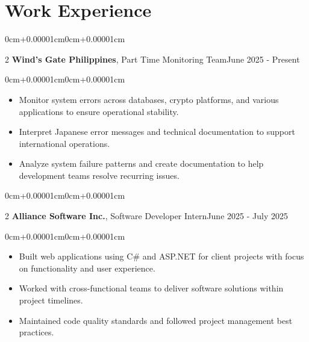 \documentclass[10pt, letterpaper]{article}
\newenvironment{highlights}{\begin{itemize}[topsep=0.10cm,parsep=0.10cm,partopsep=0pt,itemsep=0pt,leftmargin=0cm+10pt]}{\end{itemize}}
\newenvironment{onecolentry}{\begin{adjustwidth}{0cm+0.00001cm}{0cm+0.00001cm}}{\end{adjustwidth}}
\newenvironment{twocolentry}[2][]{\onecolentry\def\secondColumn{#2}\setcolumnwidth{\fill,5cm}\begin{paracol}{2}}{\switchcolumn \raggedleft \secondColumn\end{paracol}\endonecolentry}
\begin{document}
\section{Work Experience}

    \begin{twocolentry}{June 2025 - Present}
        \textbf{Wind's Gate Philippines}, Part Time Monitoring Team\end{twocolentry}
    \vspace{0.10cm}
    \begin{onecolentry}
        \begin{highlights}
            \item Monitor system errors across databases, crypto platforms, and various applications to ensure operational stability.
            \item Interpret Japanese error messages and technical documentation to support international operations.
            \item Analyze system failure patterns and create documentation to help development teams resolve recurring issues.
        \end{highlights}
    \end{onecolentry}
    \vspace{0.15cm}

    \begin{twocolentry}{June 2025 - July 2025}
        \textbf{Alliance Software Inc.}, Software Developer Intern\end{twocolentry}
    \vspace{0.10cm}
    \begin{onecolentry}
        \begin{highlights}
            \item Built web applications using C\# and ASP.NET for client projects with focus on functionality and user experience.
            \item Worked with cross-functional teams to deliver software solutions within project timelines.
            \item Maintained code quality standards and followed project management best practices.
        \end{highlights}
    \end{onecolentry}
    \vspace{0.15cm}
\end{document}
